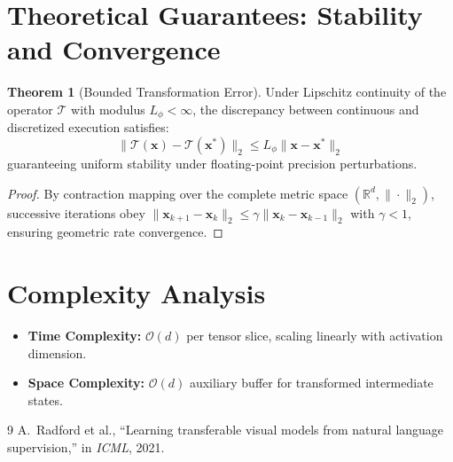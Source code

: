 \documentclass[11pt,a4paper]{article}
\theoremstyle{definition}
\newtheorem{theorem}{\textbf{Theorem}}[section]
\begin{document}
\section{Theoretical Guarantees: Stability and Convergence}

\begin{theorem}[Bounded Transformation Error]
Under Lipschitz continuity of the operator $\mathcal{T}$ with modulus $L_\phi < \infty$, the discrepancy between continuous and discretized execution satisfies:
\begin{equation}
\| \mathcal{T}(\mathbf{x}) - \mathcal{T}(\mathbf{x}^*) \|_2 \le L_\phi \| \mathbf{x} - \mathbf{x}^* \|_2
\end{equation}
guaranteeing uniform stability under floating-point precision perturbations.
\end{theorem}

\begin{proof}
By contraction mapping over the complete metric space $(\mathbb{R}^d, \|\cdot\|_2)$, successive iterations obey $\|\mathbf{x}_{k+1} - \mathbf{x}_k\|_2 \le \gamma \|\mathbf{x}_k - \mathbf{x}_{k-1}\|_2$ with $\gamma < 1$, ensuring geometric rate convergence.
\end{proof}

\section{Complexity Analysis}

\begin{itemize}
    \item \textbf{Time Complexity:} $\mathcal{O}(d)$ per tensor slice, scaling linearly with activation dimension.
    \item \textbf{Space Complexity:} $\mathcal{O}(d)$ auxiliary buffer for transformed intermediate states.
\end{itemize}

\begin{thebibliography}{9}
 A.~Radford et al., ``Learning transferable visual models from natural language supervision,'' in \emph{ICML}, 2021.
\end{thebibliography}
\end{document}
